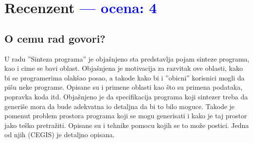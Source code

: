 \documentclass[a4paper]{report}
\newcommand{\odgovor}[1]{\textcolor{blue}{#1}}
\begin{document}
\chapter{Recenzent \odgovor{--- ocena: 4} }


\section{O cemu rad govori?}
U radu ''Sinteza programa'' je objašnjeno sta predstavlja pojam sinteze programa, kao i cime se bavi oblast. Objašnjena je motivacija za razvitak ove oblasti, kako bi se programerima olakšao posao, a takode kako bi i ''obicni'' korisnici mogli da pišu neke programe. Opisane su i primene oblasti kao što su primena podataka, popravka koda itd. Objašnjeno je da specifikacija programa koji sintezer treba da generiše mora da bude adekvatna io detaljna da bi to bilo moguce. Takode je pomenut problem prostora programa koji se mogu generisati i kako je taj prostor jako teško pretražiti. Opisane su i tehnike pomocu kojih se to može postici. Jedna od njih (CEGIS) je detaljno opisana.
\end{document}

